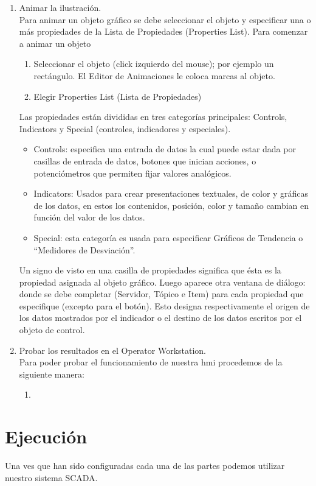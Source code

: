 \begin{enumerate}
 \item Animar la ilustración.\\
      Para animar un objeto gráfico se debe seleccionar el objeto y especificar una o
      más propiedades de la Lista de Propiedades (Properties List).
      Para comenzar a animar un objeto
      \begin{enumerate}
	\item Seleccionar el objeto (click izquierdo del mouse); por ejemplo un rectángulo. El
	Editor de Animaciones le coloca marcas al objeto.
	\item Elegir Properties List (Lista de Propiedades) 
      \end{enumerate}
      Las propiedades están divididas en tres
      categorías principales: Controls, Indicators y Special 
      (controles, indicadores y especiales).
      \begin{itemize}
	\item  Controls: especifica una entrada de datos la cual puede estar dada por 
	casillas de entrada de datos, botones que inician acciones, o
	potenciómetros que permiten fijar valores analógicos.
	\item Indicators: Usados para crear presentaciones textuales, de color
	y gráficas de los datos, en estos los contenidos, posición, color y
	tamaño cambian en función del valor de los datos.
	\item Special: esta categoría es usada para especificar Gráficos de Tendencia o
	“Medidores de Desviación”.
      \end{itemize}
      Un signo de visto en una casilla de propiedades significa que ésta es la propiedad
      asignada al objeto gráfico. Luego aparece otra ventana de diálogo:
      donde se debe completar (Servidor, Tópico e Item) para cada
      propiedad que especifique (excepto para el botón). Esto designa
      respectivamente el origen de los datos mostrados por el indicador o 
      el destino de los datos escritos por el objeto de control.
      
 \item Probar los resultados en el Operator Workstation.\\
      Para poder probar el funcionamiento de nuestra \gls{hmi} procedemos de la siguiente manera:
      \begin{enumerate}
       \item 
      \end{enumerate}
\end{enumerate}
 

\section{Ejecución}
\label{sec:Ejecucion}

Una ves que han sido configuradas cada una de las partes podemos utilizar nuestro sistema SCADA.

